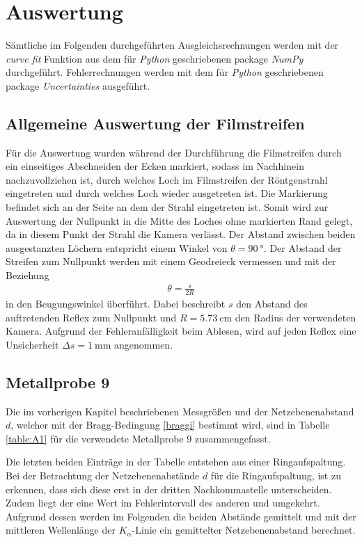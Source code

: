 \section{Auswertung}
\label{sec:Auswertung}
Sämtliche im Folgenden durchgeführten Ausgleichsrechnungen werden mit der \emph{curve fit} Funktion aus dem für \emph{Python} geschriebenen package \emph{NumPy}\cite{scipy} durchgeführt. Fehlerrechnungen werden mit dem für \emph{Python} geschriebenen package \emph{Uncertainties}\cite{uncertainties} ausgeführt.

\subsection{Allgemeine Auswertung der Filmstreifen}
\label{sec:allgemein}
Für die Auswertung wurden während der Durchführung die Filmstreifen durch ein einseitiges Abschneiden der Ecken markiert, sodass im Nachhinein nachzuvollziehen ist, durch welches Loch im Filmstreifen der Röntgenstrahl eingetreten und durch welches Loch wieder ausgetreten ist. Die Markierung befindet sich an der Seite an dem der Strahl eingetreten ist. Somit wird zur Auswertung der Nullpunkt in die Mitte des Loches ohne markierten Rand gelegt, da in diesem Punkt der Strahl die Kamera verlässt. Der Abstand zwischen beiden ausgestanzten Löchern entspricht einem Winkel von $\theta=\SI{90}{\degree}$. Der Abstand der Streifen zum Nullpunkt werden mit einem Geodreieck vermessen und mit der Beziehung
\begin{align}
	\theta=\frac{s}{2R}
\end{align}
in den Beugungswinkel überführt. Dabei beschreibt $s$ den Abstand des auftretenden Reflex zum Nullpunkt und $R=\SI{5.73}{\centi\meter}$ den Radius der verwendeten Kamera.  Aufgrund der Fehleranfälligkeit beim Ablesen, wird auf jeden Reflex eine Unsicherheit  $\Delta s=\SI{1}{\milli\meter}$ angenommen.

\subsection{Metallprobe 9}
\label{sec:Metallprobe9}
Die im vorherigen Kapitel beschriebenen Messgrößen und der Netzebenenabstand $d$, welcher mit der Bragg-Bedingung \eqref{braggi} bestimmt wird, sind in Tabelle \ref{table:A1} für die verwendete Metallprobe 9 zusammengefasst.

Die letzten beiden Einträge in der Tabelle entstehen aus einer Ringaufspaltung. Bei der Betrachtung der Netzebenenabstände $d$ für die Ringaufspaltung, ist zu erkennen, dass sich diese erst in der dritten Nachkommastelle unterscheiden. Zudem liegt der eine Wert im Fehlerintervall des anderen und umgekehrt. Aufgrund dessen werden im Folgenden die beiden Abstände gemittelt und mit der mittleren Wellenlänge der $K_\alpha$-Linie ein gemittelter Netzebenenabstand berechnet. \\

